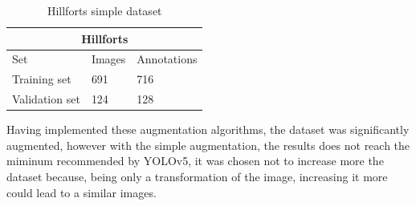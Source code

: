 \begin{table}[H]
\centering
\begin{tabular}{|p{3cm}|p{2.5cm}|p{2cm}|} 
\hline
\multicolumn{3}{|c|}{Hillforts} \\
 \hline
  Set & Images & Annotations\\ [0.5ex] 
 \hline
 Training set & 691 & 716 \\ 
 Validation set & 124 & 128  \\[1ex]
 \hline
\end{tabular}
\caption{Hillforts simple dataset}
\label{table:hillfortssimpledataset}
\end{table} 


Having implemented these augmentation algorithms, the dataset was significantly augmented, however with the simple augmentation, the results does not reach the miminum recommended by YOLOv5, it was chosen not to increase more the dataset because, being only a transformation of the image, increasing it more could lead to a similar images.